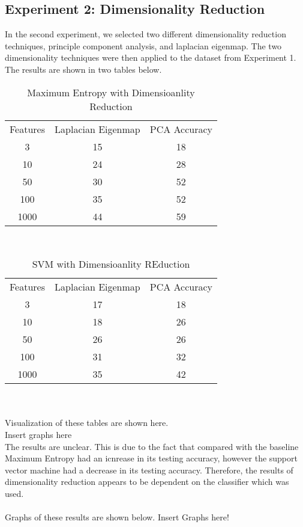 \subsection{Experiment 2: Dimensionality Reduction}
In the second experiment, we selected two different dimensionality reduction techniques, principle component analysis, and laplacian eigenmap.
The two dimensionality techniques were then applied to the dataset from Experiment 1.  The results are shown in two tables below.
\\
\begin{table}[h]
\caption{Maximum Entropy with Dimensioanlity Reduction}
\centering
\begin{tabular}{c c c}
Features & Laplacian Eigenmap & PCA Accuracy \\
3 & 15 & 18 \\
10 & 24 & 28 \\
50 & 30 & 52 \\
100 & 35 & 52 \\
1000 & 44 & 59 \\
\end{tabular}
\end{table}
\\
\begin{table}[h]
\caption{SVM with Dimensioanlity REduction}
\centering
\begin{tabular}{c c c}
Features & Laplacian Eigenmap & PCA Accuracy \\
3 & 17 & 18 \\
10 & 18 & 26 \\
50 & 26 & 26 \\
100 & 31 & 32 \\
1000 & 35 & 42 \\
\end{tabular}
\end{table}
\\
\\ Visualization of these tables are shown here.
\\ Insert graphs here
\\
The results are unclear.  This is due to the fact that compared with the baseline Maximum Entropy had an icnrease in its testing accuracy, however
the support vector machine had a decrease in its testing accuracy.  Therefore, the results of dimensionality reduction appears to be dependent
on the classifier which was used.
\\
\\ Graphs of these results are shown below.
Insert Graphs here!
\\
